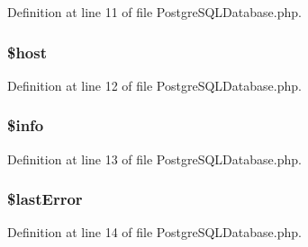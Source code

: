 Definition at line 11 of file Postgre\+S\+Q\+L\+Database.\+php.

\hypertarget{class_postgre_s_q_l_database_a711797613cb863ca0756df789c396bf2}{}
\subsubsection[{\$host}]{\setlength{\rightskip}{0pt plus 5cm}\$host\hspace{0.3cm}{\ttfamily [protected]}}\label{class_postgre_s_q_l_database_a711797613cb863ca0756df789c396bf2}


Definition at line 12 of file Postgre\+S\+Q\+L\+Database.\+php.

\hypertarget{class_postgre_s_q_l_database_ae19722790c6683980bbf0af8572f26ab}{}
\subsubsection[{\$info}]{\setlength{\rightskip}{0pt plus 5cm}\$info\hspace{0.3cm}{\ttfamily [protected]}}\label{class_postgre_s_q_l_database_ae19722790c6683980bbf0af8572f26ab}


Definition at line 13 of file Postgre\+S\+Q\+L\+Database.\+php.

\hypertarget{class_postgre_s_q_l_database_a6cb6be70a528323568af007db6a3885e}{}
\subsubsection[{\$last\+Error}]{\setlength{\rightskip}{0pt plus 5cm}\$last\+Error\hspace{0.3cm}{\ttfamily [protected]}}\label{class_postgre_s_q_l_database_a6cb6be70a528323568af007db6a3885e}


Definition at line 14 of file Postgre\+S\+Q\+L\+Database.\+php.

\hypertarget{class_postgre_s_q_l_database_a12ff8f78a47e0fa691355a485c2e696a}{}
